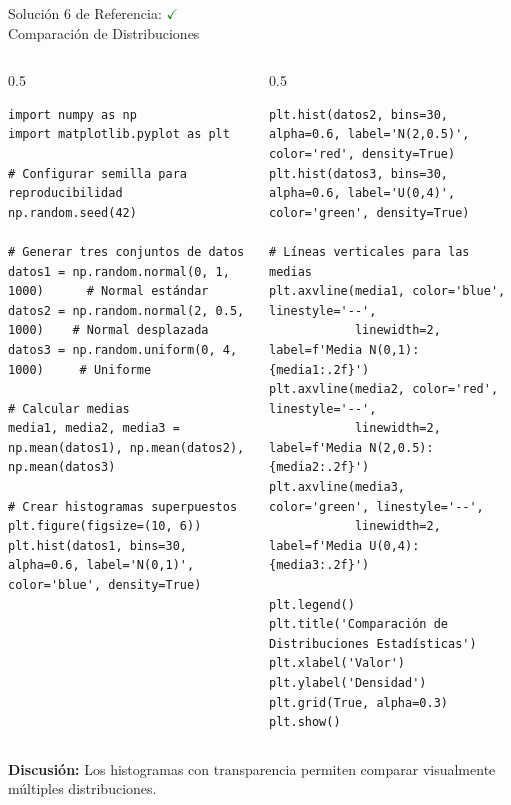 \documentclass[10pt]{beamer}
\begin{document}
\begin{frame}[fragile]{Solución 6 de Referencia: \hfill \textcolor{green}{$\checkmark$} \\ Comparación de Distribuciones}
\begin{columns}
\begin{column}{0.5\textwidth}
\begin{verbatim}
import numpy as np
import matplotlib.pyplot as plt

# Configurar semilla para reproducibilidad
np.random.seed(42)

# Generar tres conjuntos de datos
datos1 = np.random.normal(0, 1, 1000)      # Normal estándar
datos2 = np.random.normal(2, 0.5, 1000)    # Normal desplazada
datos3 = np.random.uniform(0, 4, 1000)     # Uniforme

# Calcular medias
media1, media2, media3 = np.mean(datos1), np.mean(datos2), np.mean(datos3)

# Crear histogramas superpuestos
plt.figure(figsize=(10, 6))
plt.hist(datos1, bins=30, alpha=0.6, label='N(0,1)', color='blue', density=True)
\end{verbatim}
\end{column}
\begin{column}{0.5\textwidth}
\begin{verbatim}
plt.hist(datos2, bins=30, alpha=0.6, label='N(2,0.5)', color='red', density=True)
plt.hist(datos3, bins=30, alpha=0.6, label='U(0,4)', color='green', density=True)

# Líneas verticales para las medias
plt.axvline(media1, color='blue', linestyle='--', 
            linewidth=2, label=f'Media N(0,1): {media1:.2f}')
plt.axvline(media2, color='red', linestyle='--', 
            linewidth=2, label=f'Media N(2,0.5): {media2:.2f}')
plt.axvline(media3, color='green', linestyle='--', 
            linewidth=2, label=f'Media U(0,4): {media3:.2f}')

plt.legend()
plt.title('Comparación de Distribuciones Estadísticas')
plt.xlabel('Valor')
plt.ylabel('Densidad')
plt.grid(True, alpha=0.3)
plt.show()
\end{verbatim}
\end{column}
\end{columns}
\vspace{0.3cm}
\textbf{Discusión:} Los histogramas con transparencia permiten comparar visualmente múltiples distribuciones.
\end{frame}
\fi
\end{document}
